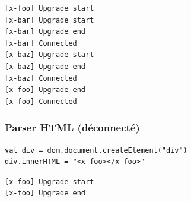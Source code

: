 \begin{lstlisting}
[x-foo] Upgrade start
[x-bar] Upgrade start
[x-bar] Upgrade end
[x-bar] Connected
[x-baz] Upgrade start
[x-baz] Upgrade end
[x-baz] Connected
[x-foo] Upgrade end
[x-foo] Connected
\end{lstlisting}


\subsubsection{Parser HTML (déconnecté)}
\begin{lstlisting}
val div = dom.document.createElement("div")
div.innerHTML = "<x-foo></x-foo>"
\end{lstlisting}

\begin{lstlisting}
[x-foo] Upgrade start
[x-foo] Upgrade end
\end{lstlisting}